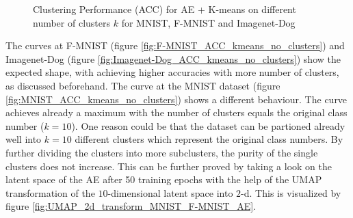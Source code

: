 \documentclass[12pt,DIV14,BCOR12mm,a4paper,footexclude,headinclude,halfparskip-,twoside,openright,cleardoubleempty,idxtotoc,bibtotoc,listtotoc,abstracton]{scrreprt} %
\numberwithin{equation}{chapter}
\begin{document}
	 \begin{figure}[htb!]
		\centering
		\qquad
		\qquad
		\caption{Clustering Performance (ACC) for AE + K-means on different number of clusters $k$ for MNIST, F-MNIST and Imagenet-Dog}
		\label{fig:ClusterPerformance_kmeans_no_clusters}
	\end{figure}
The curves at F-MNIST (figure \ref{fig:F-MNIST_ACC_kmeans_no_clusters}) and Imagenet-Dog (figure \ref{fig:Imagenet-Dog_ACC_kmeans_no_clusters}) show the expected shape, with achieving higher accuracies with more number of clusters, as discussed beforehand. The curve at the MNIST dataset (figure \ref{fig:MNIST_ACC_kmeans_no_clusters}) shows a different behaviour. The curve achieves already a maximum with the number of clusters equals the original class number ($k=10$). One reason could be that the dataset can be partioned already well into $k=10$ different clusters which represent the original class numbers. By further dividing the clusters into more subclusters, the purity of the single clusters does not increase. This can be further proved by taking a look on the latent space of the AE after 50 training epochs with the help of the UMAP transformation of the $10$-dimensional latent space into $2$-d. This is visualized by figure \ref{fig:UMAP_2d_transform_MNIST_F-MNIST_AE}.
\end{document}
